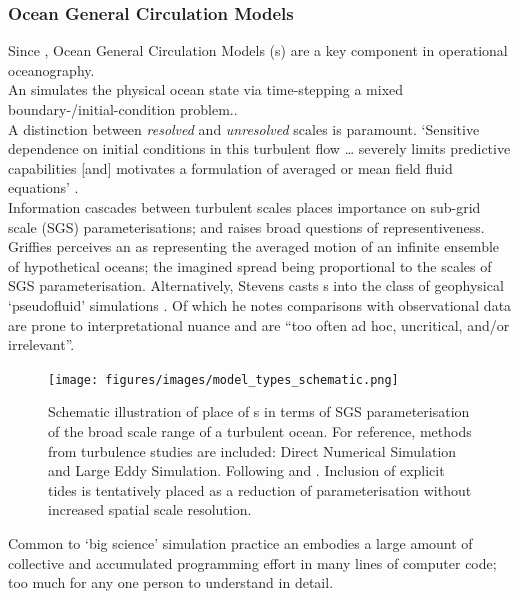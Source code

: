 \subsubsection{Ocean General Circulation Models}

Since \GODAE{}, Ocean General Circulation Models (\OGCM{}s) are a key component in operational oceanography.\\

An \OGCM{} simulates the physical ocean state via time-stepping a mixed boundary-/initial-condition problem.\citep{Griffies:2004vs}.\\
A distinction between \emph{resolved} and \emph{unresolved} scales is paramount.  `Sensitive dependence on initial conditions in this turbulent flow \dots{} severely limits predictive capabilities [and] motivates a formulation of averaged or mean field fluid equations' \citep[Sec 2.5]{Griffies:2004vs}.\\


Information cascades between turbulent scales places importance on sub-grid scale (SGS) parameterisations; and raises broad questions of representiveness.\\
Griffies perceives an \OGCM{} as representing the averaged motion of an infinite ensemble of hypothetical oceans; the imagined spread being proportional to the scales of SGS parameterisation.
Alternatively, Stevens casts \OGCM{}s into the class of geophysical `pseudofluid' simulations \citep{Stevens:2001kb}. Of which he notes comparisons with observational data are prone to interpretational nuance and are ``too often ad hoc, uncritical, and/or irrelevant''\citep[pp 286]{Stevens:2001kb}. \\

\begin{figure}[h]
\begin{center}
\texttt{[image: figures/images/model\_types\_schematic.png]}
\caption{Schematic illustration of place of \OGCM{}s in terms of SGS parameterisation of the broad scale range of a turbulent ocean.  For reference, methods from turbulence studies are included: Direct Numerical Simulation and Large Eddy Simulation. Following \citep[fig 5.2]{Petersen:2012tr} and \citep{Stevens:2001kb}.  Inclusion of explicit tides is tentatively placed as a reduction of parameterisation without increased spatial scale resolution.}
\label{fig:models}
\end{center}
\end{figure}


Common to `big science' simulation practice \citep{Petersen:2012tr} an \OGCM{} embodies a large amount of collective and accumulated programming effort in many lines of computer code; too much for any one person to understand in detail. \\



